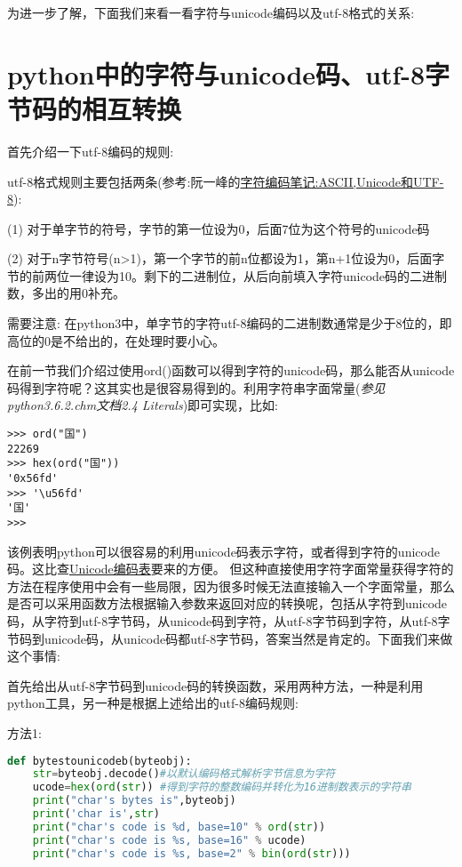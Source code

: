 \documentclass[twoside,11pt]{book}
\begin{document}
为进一步了解，下面我们来看一看字符与unicode编码以及utf-8格式的关系:

\section{python中的字符与unicode码、utf-8字节码的相互转换}
首先介绍一下utf-8编码的规则:

utf-8格式规则主要包括两条(参考:阮一峰的\href{www.sohu.com}{字符编码笔记:ASCII,Unicode和UTF-8}):

(1) 对于单字节的符号，字节的第一位设为0，后面7位为这个符号的unicode码

(2) 对于n字节符号(n>1)，第一个字节的前n位都设为1，第n+1位设为0，后面字节的前两位一律设为10。剩下的二进制位，从后向前填入字符unicode码的二进制数，多出的用0补充。

需要注意: 在python3中，单字节的字符utf-8编码的二进制数通常是少于8位的，即高位的0是不给出的，在处理时要小心。

在前一节我们介绍过使用ord()函数可以得到字符的unicode码，那么能否从unicode码得到字符呢？这其实也是很容易得到的。利用字符串字面常量(\emph{参见python3.6.2.chm文档2.4 Literals})即可实现，比如:

\begin{lstlisting}
>>> ord("国")
22269
>>> hex(ord("国"))
'0x56fd'
>>> '\u56fd'
'国'
>>>
\end{lstlisting}

该例表明python可以很容易的利用unicode码表示字符，或者得到字符的unicode码。这比查\href{www.unicode.org}{Unicode编码表}要来的方便。
但这种直接使用字符字面常量获得字符的方法在程序使用中会有一些局限，因为很多时候无法直接输入一个字面常量，那么是否可以采用函数方法根据输入参数来返回对应的转换呢，包括从字符到unicode码，从字符到utf-8字节码，从unicode码到字符，从utf-8字节码到字符，从utf-8字节码到unicode码，从unicode码都utf-8字节码，答案当然是肯定的。下面我们来做这个事情:

首先给出从utf-8字节码到unicode码的转换函数，采用两种方法，一种是利用python工具，另一种是根据上述给出的utf-8编码规则:

方法1:
\begin{lstlisting}[language=python]
def bytestounicodeb(byteobj):
    str=byteobj.decode()#以默认编码格式解析字节信息为字符
    ucode=hex(ord(str)) #得到字符的整数编码并转化为16进制数表示的字符串
    print("char's bytes is",byteobj)
    print('char is',str)
    print("char's code is %d, base=10" % ord(str))
    print("char's code is %s, base=16" % ucode)
    print("char's code is %s, base=2" % bin(ord(str)))
\end{lstlisting}
\end{document}
